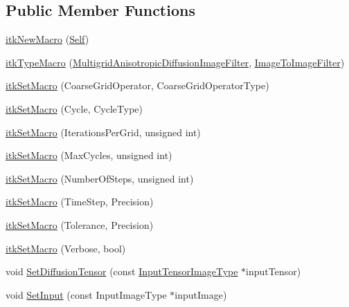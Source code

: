\subsection*{Public Member Functions}
\begin{DoxyCompactItemize}
\item 
\hyperlink{classitk_1_1_multigrid_anisotropic_diffusion_image_filter_a6e4ed4edbd2bc2eaabe60a3f7a82e285}{itk\-New\-Macro} (\hyperlink{classitk_1_1_multigrid_anisotropic_diffusion_image_filter_a7a4e0d1647645c6de01cb808db77bc5a}{Self})
\item 
\hyperlink{classitk_1_1_multigrid_anisotropic_diffusion_image_filter_a08dfe44efe545d6203dcab33c6e7d31e}{itk\-Type\-Macro} (\hyperlink{classitk_1_1_multigrid_anisotropic_diffusion_image_filter}{Multigrid\-Anisotropic\-Diffusion\-Image\-Filter}, \hyperlink{class_image_to_image_filter}{Image\-To\-Image\-Filter})
\item 
\hyperlink{classitk_1_1_multigrid_anisotropic_diffusion_image_filter_a470139536f9b713f6190692ddd6ae2bb}{itk\-Set\-Macro} (Coarse\-Grid\-Operator, Coarse\-Grid\-Operator\-Type)
\item 
\hyperlink{classitk_1_1_multigrid_anisotropic_diffusion_image_filter_a9154f4d2eec6366a5c0c64ee6dba2a42}{itk\-Set\-Macro} (Cycle, Cycle\-Type)
\item 
\hyperlink{classitk_1_1_multigrid_anisotropic_diffusion_image_filter_a30335e558311f46eba513a80ea27505c}{itk\-Set\-Macro} (Iterations\-Per\-Grid, unsigned int)
\item 
\hyperlink{classitk_1_1_multigrid_anisotropic_diffusion_image_filter_a579f69c9706b4f844df0c85fcf6d3ddb}{itk\-Set\-Macro} (Max\-Cycles, unsigned int)
\item 
\hyperlink{classitk_1_1_multigrid_anisotropic_diffusion_image_filter_a5fd91b79f46859bdf2640043854fd011}{itk\-Set\-Macro} (Number\-Of\-Steps, unsigned int)
\item 
\hyperlink{classitk_1_1_multigrid_anisotropic_diffusion_image_filter_aee6ab94268911e771f826467095af499}{itk\-Set\-Macro} (Time\-Step, Precision)
\item 
\hyperlink{classitk_1_1_multigrid_anisotropic_diffusion_image_filter_a4f5dcab9135cae277d1bfb14272fbe69}{itk\-Set\-Macro} (Tolerance, Precision)
\item 
\hyperlink{classitk_1_1_multigrid_anisotropic_diffusion_image_filter_a06efb7a8c22f1f35a6709f6731416a30}{itk\-Set\-Macro} (Verbose, bool)
\item 
void \hyperlink{classitk_1_1_multigrid_anisotropic_diffusion_image_filter_a8138ea70b96f470cdffc5b488d334b0f}{Set\-Diffusion\-Tensor} (const \hyperlink{class_image}{Input\-Tensor\-Image\-Type} $\ast$input\-Tensor)
\item 
void \hyperlink{classitk_1_1_multigrid_anisotropic_diffusion_image_filter_ac823dce9a05730f0f1f871c4d7799bcf}{Set\-Input} (const Input\-Image\-Type $\ast$input\-Image)
\end{DoxyCompactItemize}
